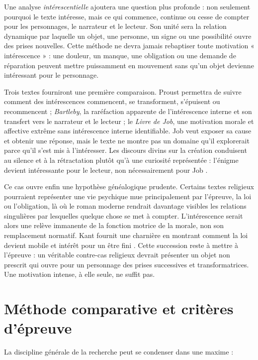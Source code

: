 \documentclass[11pt,a4paper]{article}
\begin{document}
Une analyse \emph{intérescentielle} ajoutera une question plus profonde : non
seulement pourquoi le texte intéresse, mais ce qui commence, continue ou cesse
de compter pour les personnages, le narrateur et le lecteur. Son unité sera la
relation dynamique par laquelle un objet, une personne, un signe ou une
possibilité ouvre des prises nouvelles. Cette méthode ne devra jamais rebaptiser
toute motivation « intérescence » : une douleur, un manque, une obligation ou
une demande de réparation peuvent mettre puissamment en mouvement sans qu'un
objet devienne intéressant pour le personnage.

Trois textes fourniront une première comparaison. Proust permettra de suivre
comment des intérescences commencent, se transforment, s'épuisent ou recommencent ;
\emph{Bartleby}, la raréfaction apparente de l'intérescence interne et son
transfert vers le narrateur et le lecteur ; le \emph{Livre de Job}, une
motivation morale et affective extrême sans intérescence interne identifiable.
Job veut exposer sa cause et obtenir une réponse, mais le texte ne montre pas un
domaine qu'il explorerait parce qu'il s'est mis à l'intéresser. Les discours
divins sur la création conduisent au silence et à la rétractation plutôt qu'à
une curiosité représentée : l'énigme devient intéressante pour le lecteur, non
nécessairement pour Job \parencite{jps1985tanakh}.

Ce cas ouvre enfin une hypothèse généalogique prudente. Certains textes
religieux pourraient représenter une vie psychique mue principalement par
l'épreuve, la loi ou l'obligation, là où le roman moderne rendrait davantage
visibles les relations singulières par lesquelles quelque chose se met à
compter. L'intérescence serait alors une relève immanente de la fonction motrice
de la morale, non son remplacement normatif. Kant fournit une charnière en
montrant comment la loi devient mobile et intérêt pour un être fini
\parencite{kant1848moralepratique}. Cette succession reste à mettre à l'épreuve :
un véritable contre-cas religieux devrait présenter un objet non prescrit qui
ouvre pour un personnage des prises successives et transformatrices. Une
motivation intense, à elle seule, ne suffit pas.

\section{Méthode comparative et critères d'épreuve}

La discipline générale de la recherche peut se condenser dans une maxime :
\end{document}
